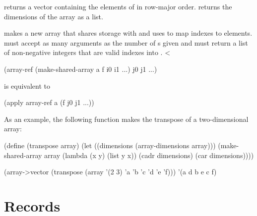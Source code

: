 returns a vector containing the elements of 
 in row-major order.
 returns the dimensions of
 the array as a list.

\begin{protos}
\end{protos}
\noindent
{} makes a new array that shares storage with 
 and uses  to map indexes to elements.
 must accept as many arguments as the number of
 s given and must return a list of non-negative integers
 that are valid indexes into .
<\begin{example}
(array-ref (make-shared-array a f i0 i1 ...)
           j0 j1 ...)
\end{example}
is equivalent to
\begin{example}
(apply array-ref a (f j0 j1 ...))
\end{example}

As an example, the following function makes the transpose of a two-dimensional
 array:
\begin{example}
(define (transpose array)
  (let ((dimensions (array-dimensions array)))
    (make-shared-array array
                       (lambda (x y)
                         (list y x))
                       (cadr dimensions)
                       (car dimensions))))

(array->vector
  (transpose
    (array '(2 3) 'a 'b 'c 'd 'e 'f)))
      \evalsto '(a d b e c f)
\end{example}

\section{Records}
\label{records}


